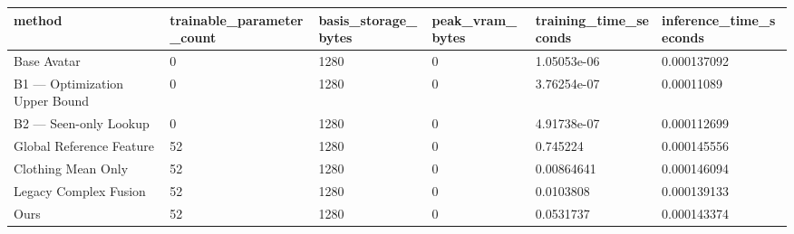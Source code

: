 \begin{tabular}{llllll}
method & trainable_parameter_count & basis_storage_bytes & peak_vram_bytes & training_time_seconds & inference_time_seconds \\
\hline
Base Avatar & 0 & 1280 & 0 & 1.05053e-06 & 0.000137092 \\
B1 — Optimization Upper Bound & 0 & 1280 & 0 & 3.76254e-07 & 0.00011089 \\
B2 — Seen-only Lookup & 0 & 1280 & 0 & 4.91738e-07 & 0.000112699 \\
Global Reference Feature & 52 & 1280 & 0 & 0.745224 & 0.000145556 \\
Clothing Mean Only & 52 & 1280 & 0 & 0.00864641 & 0.000146094 \\
Legacy Complex Fusion & 52 & 1280 & 0 & 0.0103808 & 0.000139133 \\
Ours & 52 & 1280 & 0 & 0.0531737 & 0.000143374 \\
\end{tabular}
